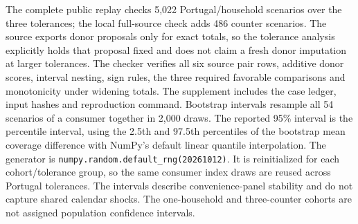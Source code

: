 The complete public replay checks 5,022 Portugal/household scenarios over
the three tolerances; the local full-source check adds 486 counter
scenarios. The source exports donor proposals only for exact totals, so
the tolerance analysis explicitly holds that proposal fixed and does not
claim a fresh donor imputation at larger tolerances. The checker verifies
all six source pair rows, additive donor scores, interval nesting, sign
rules, the three required favorable comparisons and monotonicity under
widening totals. The supplement includes the case ledger, input hashes
and reproduction command. Bootstrap intervals resample all 54 scenarios
of a consumer together in 2,000 draws. The reported 95\% interval is the
percentile interval, using the 2.5th and 97.5th percentiles of the bootstrap
mean coverage difference with NumPy's default linear quantile interpolation.
The generator is \texttt{numpy.random.default\_rng(20261012)}.
It is reinitialized for each cohort/tolerance group, so the same consumer
index draws are reused across Portugal tolerances.
The intervals describe convenience-panel
stability and do not capture shared calendar shocks. The one-household
and three-counter cohorts are not assigned population confidence intervals.
